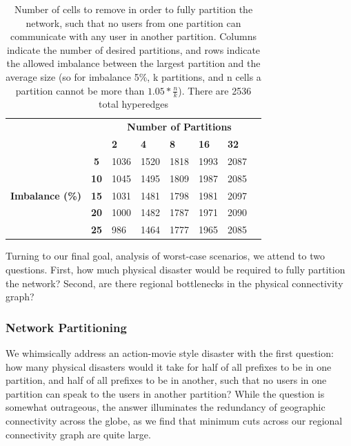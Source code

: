     \begin{table}
        \centering
        \begin{tabular}{lc|l|l|l|l|l|l}
            &&\multicolumn{5}{c}{\bf Number of Partitions}\\
            &&{\bf 2}&{\bf 4}&{\bf 8}&{\bf 16}&{\bf 32}\\
            \hline
            \multirow{5}{*}{\begin{sideways}{\bf Imbalance (\%)}\end{sideways}}
            &{\bf 5}&1036&1520&1818&1993&2087\\
            &{\bf 10}&1045&1495&1809&1987&2085\\
            &{\bf 15}&1031&1481&1798&1981&2097\\
            &{\bf 20}&1000&1482&1787&1971&2090\\
            &{\bf 25}&986&1464&1777&1965&2085\\
        \end{tabular}
        \caption[]{\label{tbl:hmetis} Number of cells to remove in order to fully partition the network, such that no users from one partition can communicate with any user in another partition. Columns indicate the number of desired partitions, and rows indicate the allowed imbalance between the largest partition and the average size (so for imbalance 5\%, k partitions, and n cells a partition cannot be more than $1.05 * \frac{n}{k}$). There are 2536 total hyperedges}
    \end{table}
        
    Turning to our final goal, analysis of worst-case scenarios, we attend to two questions. 
    First, how much physical disaster would be required to fully partition the network?         
    Second, are there regional bottlenecks in the physical connectivity graph?

    \subsubsection*{Network Partitioning}
    We whimsically address an action-movie style disaster with the first question: how many physical disasters would it take for half of all prefixes to be in one partition, and half of all prefixes to be in another, such that no users in one partition can speak to the users in another partition?
    While the question is somewhat outrageous, the answer illuminates the redundancy of geographic connectivity across the globe, as we find that minimum cuts across our regional connectivity graph are quite large.
    

